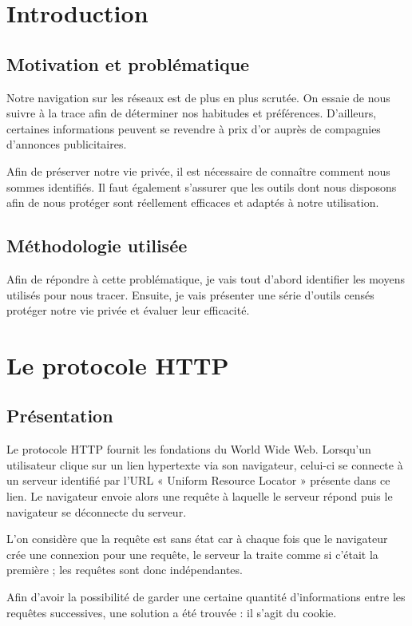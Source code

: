\documentclass[a4paper,12pt,french]{report}
\begin{document}
\tableofcontents

\chapter{Introduction}
	\section{Motivation et problématique}
Notre navigation sur les réseaux est de plus en plus scrutée. On essaie de nous suivre à la trace afin de déterminer nos habitudes et préférences. D'ailleurs, certaines informations peuvent se revendre à prix d'or auprès de compagnies d'annonces publicitaires.

Afin de préserver notre vie privée, il est nécessaire de connaître comment nous sommes identifiés. Il faut également s'assurer que les outils dont nous disposons afin de nous protéger sont réellement efficaces et adaptés à notre utilisation.

	\section{Méthodologie utilisée}
Afin de répondre à cette problématique, je vais tout d'abord identifier les moyens utilisés pour nous tracer. Ensuite, je vais présenter une série d'outils censés protéger notre vie privée et évaluer leur efficacité.

\chapter{Le protocole HTTP}
	\section{Présentation}
Le protocole HTTP fournit les fondations du World Wide Web. Lorsqu'un utilisateur clique sur un lien hypertexte via son navigateur, celui-ci se connecte à un serveur identifié par l'URL « Uniform Resource Locator » présente dans ce lien. Le navigateur envoie alors une requête à laquelle le serveur répond puis le navigateur se déconnecte du serveur.

L'on considère que la requête est sans état car à chaque fois que le navigateur crée une connexion pour une requête, le serveur la traite comme si c'était la première ; les requêtes sont donc indépendantes.

Afin d'avoir la possibilité de garder une certaine quantité d'informations entre les requêtes successives, une solution a été trouvée : il s'agit du cookie.
\end{document}
